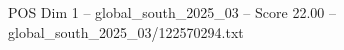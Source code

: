 \begin{textsample}{POS Dim 1 – global\_south\_2025\_03 – Score 22.00 – global\_south\_2025\_03/122570294.txt}
\end{textsample}
